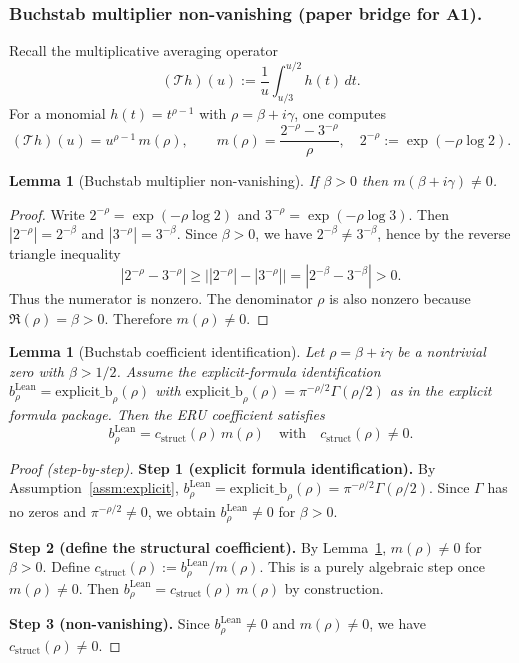 \documentclass[11pt]{article}
\theoremstyle{plain}
\newtheorem{lemma}[theorem]{Lemma}
\theoremstyle{definition}
\newcommand{\brhoLean}{b_\rho^{\mathrm{Lean}}}
\begin{document}
\subsubsection*{Buchstab multiplier non-vanishing (paper bridge for A1).}
Recall the multiplicative averaging operator
\[
(\mathcal{T}h)(u) := \frac{1}{u}\int_{u/3}^{u/2} h(t)\,dt .
\]
For a monomial $h(t)=t^{\rho-1}$ with $\rho=\beta+i\gamma$, one computes
\[
(\mathcal{T}h)(u)=u^{\rho-1}\, m(\rho), \qquad
m(\rho)=\frac{2^{-\rho}-3^{-\rho}}{\rho},
\quad 2^{-\rho}:=\exp(-\rho\log 2).
\]
\begin{lemma}[Buchstab multiplier non-vanishing]\label{lem:buchstab-m-nonzero}
If $\beta>0$ then $m(\beta+i\gamma)\neq 0$.
\end{lemma}
\begin{proof}
Write $2^{-\rho}=\exp(-\rho\log 2)$ and $3^{-\rho}=\exp(-\rho\log 3)$.
Then $|2^{-\rho}|=2^{-\beta}$ and $|3^{-\rho}|=3^{-\beta}$. Since $\beta>0$,
we have $2^{-\beta}\neq 3^{-\beta}$, hence by the reverse triangle inequality
\[
|2^{-\rho}-3^{-\rho}| \ge \big||2^{-\rho}|-|3^{-\rho}|\big|
= |2^{-\beta}-3^{-\beta}|>0.
\]
Thus the numerator is nonzero. The denominator $\rho$ is also nonzero because
$\Re(\rho)=\beta>0$. Therefore $m(\rho)\neq 0$.
\end{proof}

\begin{lemma}[Buchstab coefficient identification]\label{lem:buchstab-coefficient}
  Let $\rho=\beta+i\gamma$ be a nontrivial zero with $\beta>1/2$. Assume the
  explicit-formula identification
  $\brhoLean=\mathrm{explicit\_b}_\rho(\rho)$ with
  $\mathrm{explicit\_b}_\rho(\rho)=\pi^{-\rho/2}\Gamma(\rho/2)$ as in the
  explicit formula package. Then the ERU coefficient satisfies
  \[
  \brhoLean = c_{\mathrm{struct}}(\rho)\, m(\rho)
  \quad\text{with}\quad c_{\mathrm{struct}}(\rho)\neq 0.
  \]
\end{lemma}
\begin{proof}[Proof (step-by-step)]
  \textbf{Step 1 (explicit formula identification).} By
  Assumption~\ref{assm:explicit},
  $\brhoLean=\mathrm{explicit\_b}_\rho(\rho)=\pi^{-\rho/2}\Gamma(\rho/2)$.
  Since $\Gamma$ has no zeros and $\pi^{-\rho/2}\neq 0$, we obtain
  $\brhoLean\neq 0$ for $\beta>0$.

\textbf{Step 2 (define the structural coefficient).} By
Lemma~\ref{lem:buchstab-m-nonzero}, $m(\rho)\neq 0$ for $\beta>0$. Define
$c_{\mathrm{struct}}(\rho) := \brhoLean / m(\rho)$. This is a purely algebraic
step once $m(\rho)\neq 0$. Then
$\brhoLean = c_{\mathrm{struct}}(\rho)\, m(\rho)$ by construction.

\textbf{Step 3 (non-vanishing).} Since $\brhoLean\neq 0$ and $m(\rho)\neq 0$,
we have $c_{\mathrm{struct}}(\rho)\neq 0$.
\end{proof}
\end{document}
